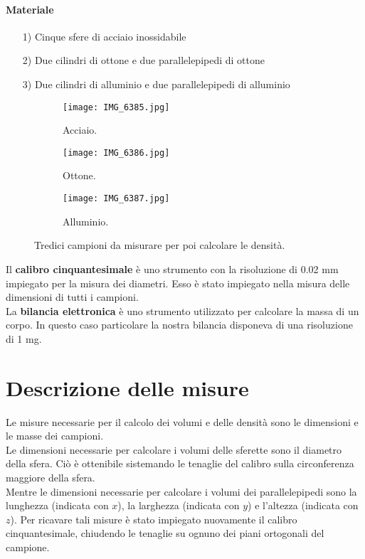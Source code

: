 \documentclass[8pt]{article}
\begin{document}
\paragraph{Materiale}
\begin{itemize}
\item[1)] Cinque sfere di acciaio inossidabile
\item[2)] Due cilindri di ottone e due parallelepipedi di ottone
\item[3)] Due cilindri di alluminio e due parallelepipedi di alluminio
\end{itemize}

\begin{figure}[h!]
  \centering
  \begin{subfigure}[b]{0.3\linewidth}
    \texttt{[image: IMG\_6385.jpg]}
    \caption{Acciaio.}
  \end{subfigure}
  \begin{subfigure}[b]{0.3\linewidth}
    \texttt{[image: IMG\_6386.jpg]}
    \caption{Ottone.}
  \end{subfigure}
\begin{subfigure}[b]{0.3\linewidth}
    \texttt{[image: IMG\_6387.jpg]}
    \caption{Alluminio.}
  \end{subfigure}
  \caption{Tredici campioni da misurare per poi calcolare le densità.}
  \label{fig:campioni}
\end{figure}

Il \textbf{calibro cinquantesimale} è uno strumento con la risoluzione di 0.02 mm
impiegato per la misura dei diametri. Esso è stato impiegato nella misura
delle dimensioni di tutti i campioni. \\

La \textbf{bilancia elettronica} è uno strumento utilizzato per calcolare la massa di un corpo.
In questo caso particolare la nostra bilancia disponeva di una risoluzione di 1 mg.

\section{Descrizione delle misure}
Le misure necessarie per il calcolo dei volumi e delle densità sono le dimensioni e le masse
dei campioni. \\
Le dimensioni necessarie per calcolare i volumi delle sferette sono il diametro della sfera.
Ciò è ottenibile sistemando le tenaglie del calibro sulla circonferenza maggiore della sfera. \\
Mentre le dimensioni necessarie per calcolare i volumi dei parallelepipedi sono la lunghezza 
(indicata con $x$), la larghezza (indicata con $y$) e l'altezza (indicata con $z$). Per ricavare
tali misure è stato impiegato nuovamente il calibro cinquantesimale, chiudendo le tenaglie su ognuno
dei piani ortogonali del campione. \\
\end{document}
